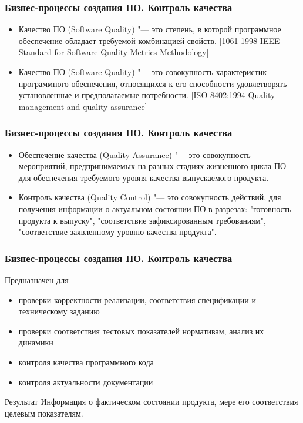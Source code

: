 \documentclass{../industrial-development}
\begin{document}
\begin{frame} \frametitle{Бизнес-процессы создания ПО. Контроль качества}
	\begin{itemize}
		\item Качество ПО (Software Quality) "--- это степень, в которой программное обеспечение обладает требуемой комбинацией свойств. [1061-1998 IEEE Standard for Software Quality Metrics Methodology]
		\item Качество ПО (Software Quality) "--- это совокупность характеристик программного обеспечения, относящихся к его способности удовлетворять установленные и предполагаемые потребности. [ISO 8402:1994 Quality management and quality assurance]
	\end{itemize}
\end{frame}
\lecturenotes


\begin{frame} \frametitle{Бизнес-процессы создания ПО. Контроль качества}
	\begin{itemize}
		\item Обеспечение качества (Quality Assurance) "--- это совокупность мероприятий, предпринимаемых на разных стадиях жизненного цикла ПО для обеспечения требуемого уровня качества выпускаемого продукта.
		\item Контроль качества (Quality Control) "--- это совокупность действий, для получения информации о актуальном состоянии ПО в разрезах: "готовность продукта к выпуску", "соответствие зафиксированным требованиям", "соответствие заявленному уровню качества продукта".
	\end{itemize}
\end{frame}
\lecturenotes


\begin{frame} \frametitle{Бизнес-процессы создания ПО. Контроль качества}
	\begin{block}{Предназначен для}
		\begin{itemize}
			\item проверки корректности реализации, соответствия спецификации и техническому заданию
			\item проверки соответствия тестовых показателей нормативам, анализ их динамики
			\item контроля качества программного кода
			\item контроля актуальности документации
		\end{itemize}
	\end{block}
	\begin{block}{Результат}
		Информация о фактическом состоянии продукта, мере его соответствия целевым показателям.
	\end{block}
\end{frame}
\lecturenotes
\end{document}
